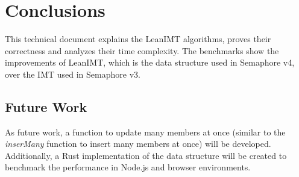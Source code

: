 \documentclass{article}
\begin{document}
\section{Conclusions}

This technical document explains the LeanIMT algorithms, proves their correctness and analyzes their time complexity. The benchmarks show the improvements of LeanIMT, which is the data structure used in Semaphore v4, over the IMT used in Semaphore v3.

\subsection{Future Work}

As future work, a function to update many members at once (similar to the \textit{inserMany} function to insert many members at once) will be developed. Additionally, a Rust implementation of the data structure will be created to benchmark the performance in Node.js and browser environments.

\sloppy

\printbibliography

\end{document}
